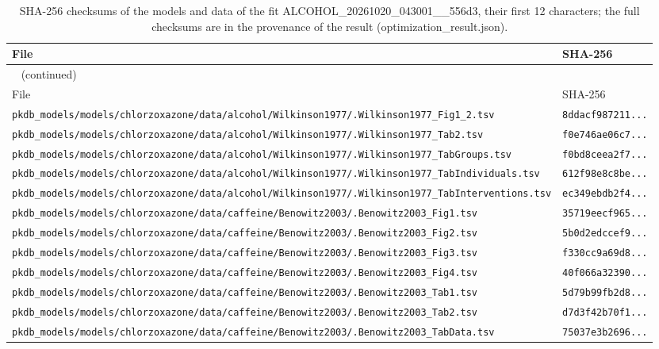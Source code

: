 \begin{longtable}{ll}
\caption{SHA-256 checksums of the models and data of the fit ALCOHOL\_20261020\_043001\_\_556d3, their first 12 characters; the full checksums are in the provenance of the result (optimization\_result.json).}\label{tab:checksums:ALCOHOL_20261020_043001__556d3} \\
\toprule
File & SHA-256 \\
\midrule
\endfirsthead
\multicolumn{2}{l}{\small\tablename~\thetable{} (continued)} \\
\toprule
File & SHA-256 \\
\midrule
\endhead
\bottomrule
\endlastfoot
\texttt{pkdb\_models/models/chlorzoxazone/data/alcohol/Wilkinson1977/.Wilkinson1977\_Fig1\_2.tsv} & \texttt{8ddacf987211...} \\
\texttt{pkdb\_models/models/chlorzoxazone/data/alcohol/Wilkinson1977/.Wilkinson1977\_Tab2.tsv} & \texttt{f0e746ae06c7...} \\
\texttt{pkdb\_models/models/chlorzoxazone/data/alcohol/Wilkinson1977/.Wilkinson1977\_TabGroups.tsv} & \texttt{f0bd8ceea2f7...} \\
\texttt{pkdb\_models/models/chlorzoxazone/data/alcohol/Wilkinson1977/.Wilkinson1977\_TabIndividuals.tsv} & \texttt{612f98e8c8be...} \\
\texttt{pkdb\_models/models/chlorzoxazone/data/alcohol/Wilkinson1977/.Wilkinson1977\_TabInterventions.tsv} & \texttt{ec349ebdb2f4...} \\
\texttt{pkdb\_models/models/chlorzoxazone/data/caffeine/Benowitz2003/.Benowitz2003\_Fig1.tsv} & \texttt{35719eecf965...} \\
\texttt{pkdb\_models/models/chlorzoxazone/data/caffeine/Benowitz2003/.Benowitz2003\_Fig2.tsv} & \texttt{5b0d2edccef9...} \\
\texttt{pkdb\_models/models/chlorzoxazone/data/caffeine/Benowitz2003/.Benowitz2003\_Fig3.tsv} & \texttt{f330cc9a69d8...} \\
\texttt{pkdb\_models/models/chlorzoxazone/data/caffeine/Benowitz2003/.Benowitz2003\_Fig4.tsv} & \texttt{40f066a32390...} \\
\texttt{pkdb\_models/models/chlorzoxazone/data/caffeine/Benowitz2003/.Benowitz2003\_Tab1.tsv} & \texttt{5d79b99fb2d8...} \\
\texttt{pkdb\_models/models/chlorzoxazone/data/caffeine/Benowitz2003/.Benowitz2003\_Tab2.tsv} & \texttt{d7d3f42b70f1...} \\
\texttt{pkdb\_models/models/chlorzoxazone/data/caffeine/Benowitz2003/.Benowitz2003\_TabData.tsv} & \texttt{75037e3b2696...} \\

\end{longtable}
